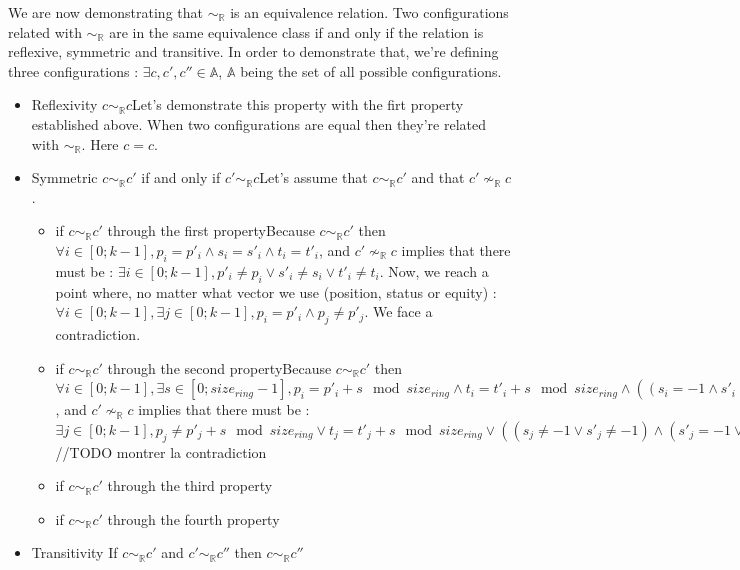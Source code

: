 \documentclass{article}
\begin{document}
We are now demonstrating that $\sim_{\mathbb{R}}$ is an equivalence relation. Two configurations related with $\sim_{\mathbb{R}}$ are in the same equivalence class if and only if the relation is reflexive, symmetric and transitive. In order to demonstrate that, we're defining three configurations : $\exists c, c', c'' \in \mathbb{A} $, $\mathbb{A}$ being the set of all possible configurations.
\begin{itemize}
    \item Reflexivity $c\sim_{\mathbb{R}}c$\newline Let's demonstrate this property with the firt property established above. When two configurations are equal then they're related with $\sim_{\mathbb{R}}$. Here $c = c$.
    \item Symmetric $c\sim_{\mathbb{R}}c'$ if and only if $c'\sim_{\mathbb{R}}c$\newline Let's assume that $c\sim_{\mathbb{R}}c'$ and that $c'\nsim_{\mathbb{R}}c$.
    \begin{itemize}
        \item if $c\sim_{\mathbb{R}}c'$ through the first property\newline Because $c\sim_{\mathbb{R}}c'$ then $\forall i \in [0;k-1], p_{i} = p'_{i} \land s_{i} = s'_{i} \land t_{i} = t'_{i}$, and $c'\nsim_{\mathbb{R}}c$ implies that there must be : $\exists i \in [0; k-1], p'_{i} \not= p_{i} \lor s'_{i} \not= s_{i} \lor t'_{i} \not= t_{i}$. Now, we reach a point where, no matter what vector we use (position, status or equity) : $\forall i \in [0;k-1], \exists j \in [0; k-1],  p_{i} = p'_{i} \land p_{j} \not= p'_{j}$. We face a contradiction.
        \item if $c\sim_{\mathbb{R}}c'$ through the second property\newline Because $c\sim_{\mathbb{R}}c'$ then $\forall i \in [0;k-1], \exists s \in [0; size_{ring}-1], p_{i} = p'_{i} + s \mod{size_{ring}} \land t_{i} = t'_{i} + s \mod{size_{ring}} \land ((s_{i} = -1 \land s'_{i} = -1) \lor (s'_{i} \not= -1 \land s_{i} = s'_{i} + s \mod{size_{ring}}))$, and $c'\nsim_{\mathbb{R}}c$ implies that there must be : $\exists j \in [0;k-1], p_{j} \not= p'_{j} + s \mod{size_{ring}} \lor t_{j} = t'_{j} + s \mod{size_{ring}} \lor ((s_{j} \not= -1 \lor s'_{j} \not= -1) \land (s'_{j} = -1 \lor s_{j} \not= s'_{j} + s \mod{size_{ring}}))$
        //TODO montrer la contradiction
        \item if $c\sim_{\mathbb{R}}c'$ through the third property
        \item if $c\sim_{\mathbb{R}}c'$ through the fourth property
    \end{itemize}
    \item Transitivity If $c\sim_{\mathbb{R}}c'$ and $c'\sim_{\mathbb{R}}c''$ then $c\sim_{\mathbb{R}}c''$
\end{itemize}
\end{document}
